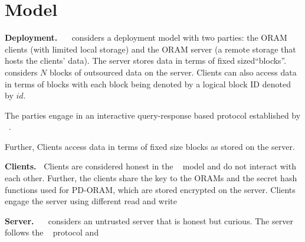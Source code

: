 \section{Model}
\label{model}

{\bf Deployment.~} \sysname~ considers a deployment model with two parties: the ORAM clients (with limited 
local storage) and the ORAM server (a remote storage that hosts the clients' data).
The server stores data in terms of fixed sized``blocks''. \sysname~ considers $N$ 
blocks of outsourced data on the server. Clients can also access data in terms of 
blocks with each block being denoted by a logical block ID denoted by $id$. 


The parties engage in an interactive query-response based protocol established 
by \sysoram~. 

Further, Clients access data in terms of fixed size blocks 
as stored on the server. 

{\bf Clients.~} Clients are considered honest in the \sysoram~ model and 
do not interact with each other. Further, the clients share the key to the ORAMs and 
the secret hash functions used for PD-ORAM, which are stored encrypted on the server.
Clients engage the server using different read and write 

{\bf Server.~} \sysname~ considers an untrusted server that is honest but curious.
The server follows the \sysname~ protocol and 
